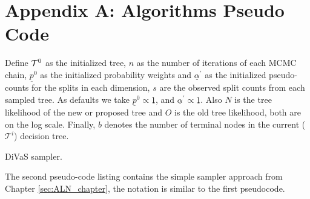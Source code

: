 
\section*{Appendix A:  Algorithms Pseudo Code}
Define $\small{\mathcal{T}^0}$ as the initialized tree, $n$ as the number of iterations of each MCMC chain, $\underline{p}^0$ as the initialized probability weights and $\underline{\alpha}^\prime$ as the initialized pseudo-counts for the splits in each dimension, $s$ are the observed split counts from each sampled tree. As defaults we take $\underline{p}^0\propto \underline{1}$, and  $\underline{\alpha}^\prime \propto \underline{1}$. Also $N$ is the tree likelihood of the new or proposed tree and $O$ is the old tree likelihood, both are on the log scale. Finally, $b$ denotes the number of terminal nodes in the current ($\mathcal{T}^i$) decision tree. 

\begin{algorithm}[H]
\caption{DiVaS sampler.}\label{psd:DiVaS_sampler}
\end{algorithm}

The second pseudo-code listing contains the simple sampler approach from Chapter \ref{sec:ALN_chapter}, the notation is similar to the first pseudocode.  

